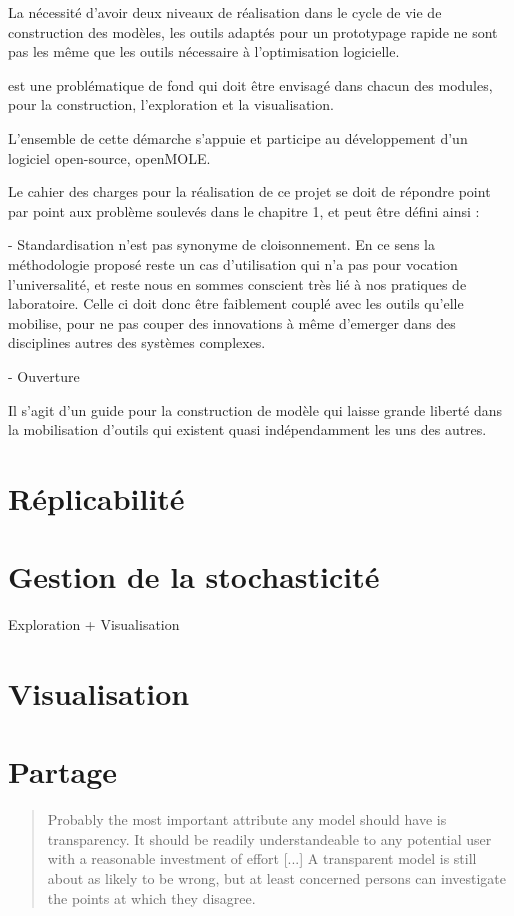 La nécessité d'avoir deux niveaux de réalisation dans le cycle de vie de construction des modèles, les outils adaptés pour un prototypage rapide ne sont pas les même que les outils nécessaire à l'optimisation logicielle. 

est une problématique de fond qui doit être envisagé dans chacun des modules, pour la construction, l'exploration et la visualisation.

L'ensemble de cette démarche s'appuie et participe au développement d'un logiciel open-source, openMOLE. 

Le cahier des charges pour la réalisation de ce projet se doit de répondre point par point aux problème soulevés dans le chapitre 1, et peut être défini ainsi : 

- Standardisation n'est pas synonyme de cloisonnement. En ce sens la méthodologie proposé reste un cas d'utilisation qui n'a pas pour vocation l'universalité, et reste nous en sommes conscient très lié à nos pratiques de laboratoire. Celle ci doit donc être faiblement couplé avec les outils qu'elle mobilise, pour ne pas couper des innovations à même d'emerger dans des disciplines autres des systèmes complexes.

- Ouverture 

Il s'agit d'un guide pour la construction de modèle qui laisse grande liberté dans la mobilisation d'outils  qui existent quasi indépendamment les uns des autres.

\section{Réplicabilité}
\lipsum[1]

\section{Gestion de la stochasticité}
\lipsum[1]
Exploration + Visualisation

\section{Visualisation}
\lipsum[1]

\section{Partage}

\begin{quotation} Probably the most important attribute any model should have is transparency. It should be readily understandeable to any potential user with a reasonable investment of effort [...] A transparent model is still about as likely to be wrong, but at least concerned persons can investigate the points at which they disagree.
\end{quotation}

\stopcontents[chapters]


